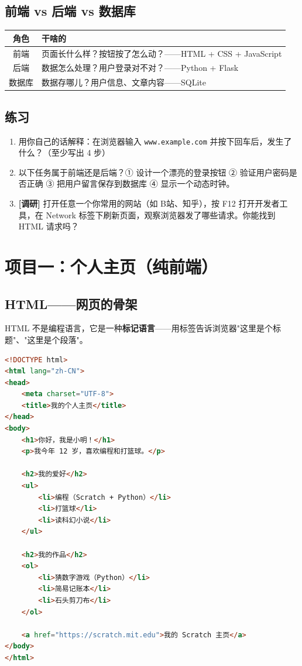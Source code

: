 \documentclass[a4paper,12pt]{ctexart}
\begin{document}
\subsection*{前端 vs 后端 vs 数据库}

\begin{center}
\begin{tabular}{|c|l|}
\hline
\textbf{角色} & \textbf{干啥的} \\ \hline
前端 & 页面长什么样？按钮按了怎么动？——HTML + CSS + JavaScript \\ \hline
后端 & 数据怎么处理？用户登录对不对？——Python + Flask \\ \hline
数据库 & 数据存哪儿？用户信息、文章内容——SQLite \\ \hline
\end{tabular}
\end{center}

\subsection*{练习}

\begin{enumerate}
  \item 用你自己的话解释：在浏览器输入 \texttt{www.example.com} 并按下回车后，发生了什么？（至少写出 4 步）
  \item 以下任务属于前端还是后端？① 设计一个漂亮的登录按钮 ② 验证用户密码是否正确 ③ 把用户留言保存到数据库 ④ 显示一个动态时钟。
  \item \textbf{[调研]} 打开任意一个你常用的网站（如 B站、知乎），按 F12 打开开发者工具，在 Network 标签下刷新页面，观察浏览器发了哪些请求。你能找到 HTML 请求吗？
\end{enumerate}

\section*{项目一：个人主页（纯前端）}

\subsection*{HTML——网页的骨架}

HTML 不是编程语言，它是一种\textbf{标记语言}——用标签告诉浏览器"这里是个标题"、"这里是个段落"。

\begin{lstlisting}[language=HTML]
<!DOCTYPE html>
<html lang="zh-CN">
<head>
    <meta charset="UTF-8">
    <title>我的个人主页</title>
</head>
<body>
    <h1>你好，我是小明！</h1>
    <p>我今年 12 岁，喜欢编程和打篮球。</p>
    
    <h2>我的爱好</h2>
    <ul>
        <li>编程（Scratch + Python）</li>
        <li>打篮球</li>
        <li>读科幻小说</li>
    </ul>
    
    <h2>我的作品</h2>
    <ol>
        <li>猜数字游戏（Python）</li>
        <li>简易记账本</li>
        <li>石头剪刀布</li>
    </ol>
    
    <a href="https://scratch.mit.edu">我的 Scratch 主页</a>
</body>
</html>
\end{lstlisting}
\end{document}
